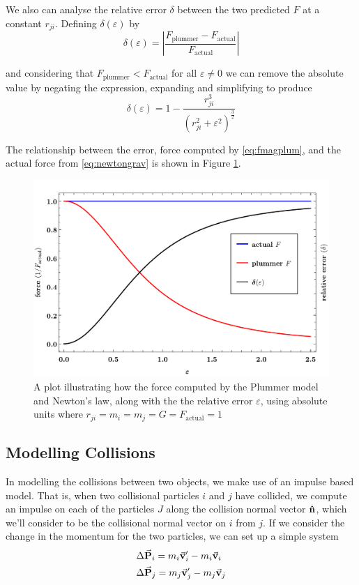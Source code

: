 \documentclass[12pt, twoside, letterpaper]{article}
\begin{document}
We also can analyse the relative error $\delta$ between the two predicted $F$ at a constant $r_{ji}$. Defining $\delta(\varepsilon)$ by
\begin{equation} \label{eq:epsilonerrabs}
\delta(\varepsilon) = \left|\frac{F_{\text{plummer}} - F_{\text{actual}}}{F_{\text{actual}}}\right|
\end{equation}

\noindent and considering that $F_{\text{plummer}} < F_{\text{actual}}$ for all $\varepsilon \neq 0$ we can remove the absolute value by negating the expression, expanding and simplifying to produce
\begin{equation} \label{eq:epsilonerr}
\delta(\varepsilon) = 1-\frac{r_{ji}^3}{(r_{ji}^2+\varepsilon^2)^\frac{3}{2}}
\end{equation}

\noindent The relationship between the error, force computed by \eqref{eq:fmagplum}, and the actual force from \eqref{eq:newtongrav} is shown in Figure \ref{fig:epsilonerrs}.
\begin{figure}[h]
\caption{A plot illustrating how the force computed by the Plummer model and Newton's law, along with the the relative error $\varepsilon$, using absolute units where $r_{ji} = m_i = m_j = G = F_{\text{actual}} = 1$}
\centerline{\includegraphics[width=.9\textwidth]{errorepsilon.pdf}}
\label{fig:epsilonerrs}
\end{figure}

\subsection{Modelling Collisions} \label{subsec:collision}
In modelling the collisions between two objects, we make use of an impulse based model. That is, when two collisional particles $i$ and $j$ have collided, we compute an impulse on each of the particles $J$ along the collision normal vector $\vu{n}$, which we'll consider to be the collisional normal vector on $i$ from $j$. If we consider the change in the momentum for the two particles, we can set up a simple system
\begin{subequations} \label{eq:deltmom}
	\begin{align}
		& \Delta \va{P}_i = m_i\va{v}_i^\prime - m_i\va{v}_i \label{eq:momi} \\
		& \Delta \va{P}_j = m_j\va{v}_j^\prime - m_j\va{v}_j \label{eq:momj}
	\end{align}
\end{subequations}
\end{document}
